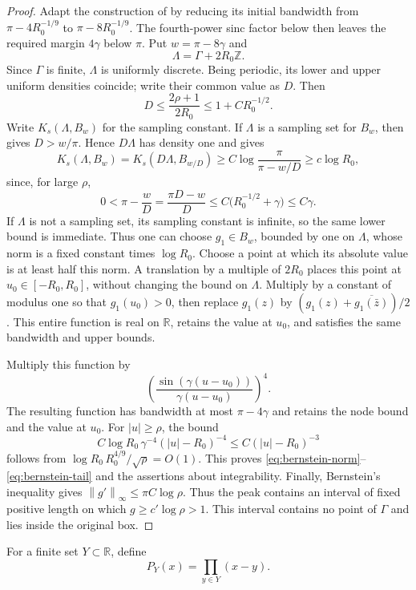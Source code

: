 \documentclass[11pt]{article}
\theoremstyle{definition}
\numberwithin{equation}{section}
\newcommand{\R}{\mathbb R}
\newcommand{\Z}{\mathbb Z}
\newcommand{\norm}[1]{\left\lVert #1\right\rVert}
\begin{document}
\begin{proof}
Adapt the construction of \cite[Lemma~4.1, pp.~184--185]{OU} by reducing
its initial bandwidth from \(\pi-4R_0^{-1/9}\) to
\(\pi-8R_0^{-1/9}\). The fourth-power sinc factor below then leaves
the required margin \(4\gamma\) below \(\pi\).
Put \(w=\pi-8\gamma\) and
\[
 \Lambda=\Gamma+2R_0\Z.
\]
Since \(\Gamma\) is finite, \(\Lambda\) is uniformly discrete. Being
periodic, its lower and upper uniform densities coincide; write their
common value as \(D\). Then
\[
 D\le\frac{2\rho+1}{2R_0}\le1+CR_0^{-1/2}.
\]
Write \(K_s(\Lambda,B_w)\) for the sampling constant. If \(\Lambda\)
is a sampling set for \(B_w\), then \cite[Theorem~C(i), p.~179]{OU} gives
\(D>w/\pi\). Hence \(D\Lambda\) has density one and
\cite[Theorem~1(i), p.~180]{OU} gives
\[
 K_s(\Lambda,B_w)
 =K_s(D\Lambda,B_{w/D})
 \ge C\log\frac{\pi}{\pi-w/D}
 \ge c\log R_0,
\]
since, for large \(\rho\),
\[
 0<\pi-\frac wD=\frac{\pi D-w}{D}
 \le C\bigl(R_0^{-1/2}+\gamma\bigr)\le C\gamma.
\]
If \(\Lambda\) is not a sampling set,
its sampling constant is infinite, so the same lower bound is immediate.
Thus one can choose \(g_1\in B_w\), bounded by one on \(\Lambda\),
whose norm is a fixed constant times \(\log R_0\).
Choose a point at which its absolute value is at least half this norm.
A translation by a multiple of \(2R_0\) places this point at
\(u_0\in[-R_0,R_0]\), without changing the bound on \(\Lambda\).
Multiply by a constant of modulus one so that \(g_1(u_0)>0\), then
replace \(g_1(z)\) by
\((g_1(z)+\overline{g_1(\bar z)})/2\). This entire function is real on
\(\R\), retains the value at \(u_0\), and satisfies the same bandwidth
and upper bounds.

Multiply this function by
\[
 \left(\frac{\sin(\gamma(u-u_0))}
 {\gamma(u-u_0)}\right)^4.
\]
The resulting function has bandwidth at most \(\pi-4\gamma\) and
retains the node bound and the value at \(u_0\).
For \(|u|\ge\rho\), the bound
\[
 C\log R_0\,\gamma^{-4}(|u|-R_0)^{-4}
 \le C(|u|-R_0)^{-3}
\]
follows from
\(\log R_0\,R_0^{4/9}/\sqrt{\rho}=O(1)\).
This proves \eqref{eq:bernstein-norm}--\eqref{eq:bernstein-tail}
and the assertions about integrability.
Finally, Bernstein's inequality gives
\(\norm{g'}_\infty\le\pi C\log\rho\).
Thus the peak contains an interval of fixed positive length on which
\(g\ge c'\log\rho>1\). This interval contains no point of \(\Gamma\)
and lies inside the original box.
\end{proof}

For a finite set \(Y\subset\R\), define
\[
 P_Y(x)=\prod_{y\in Y}(x-y).
\]
\end{document}
